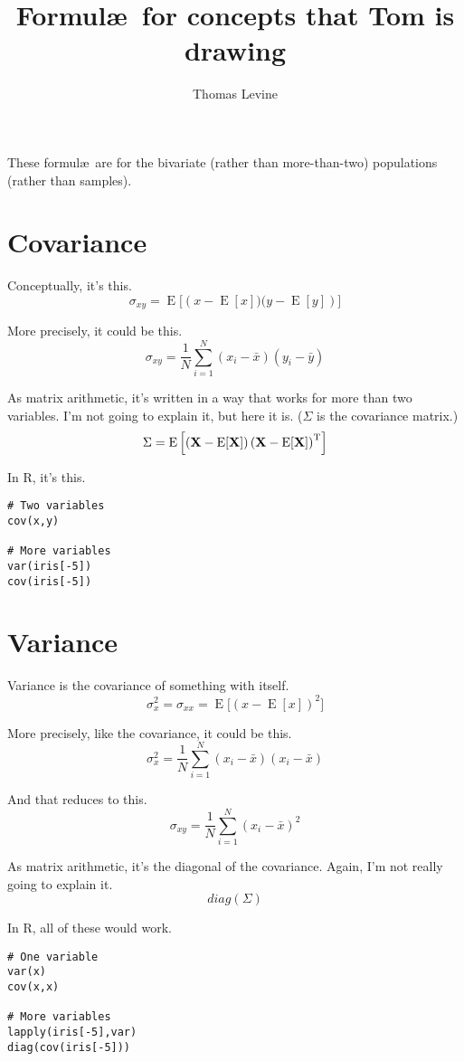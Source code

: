 \documentclass{article}
\title{Formul\ae\ for concepts that Tom is drawing}
\author{Thomas Levine}
\begin{document}
\maketitle

These formul\ae\ are for the bivariate (rather than more-than-two) populations (rather than samples).

\section{Covariance}
Conceptually, it's this.
$$ \sigma_{xy} = \operatorname{E}{\big[\left(x - \operatorname{E}[x])(y - \operatorname{E}[y]\right)\big]} $$

More precisely, it could be this.
$$ \sigma_{xy} = \frac{1}{N}\sum_{i=1}^{N}\left( x_{i}-\bar{x} \right) \left( y_{i}-\bar{y} \right) $$

As matrix arithmetic, it's written in a way that works for more than two variables.
I'm not going to explain it, but here it is. ($\Sigma$ is the covariance matrix.)
$$ \Sigma=\mathrm{E}
\left[
 \left(
  \textbf{X} - \mathrm{E}[\textbf{X}]
   \right)
  \left(
   \textbf{X} - \mathrm{E}[\textbf{X}]
    \right)^{\rm T}
    \right]
$$

In R, it's this.

\begin{verbatim}
# Two variables
cov(x,y)

# More variables
var(iris[-5])
cov(iris[-5])
\end{verbatim}

\section{Variance}
Variance is the covariance of something with itself.
$$ \sigma_{x}^2 = \sigma_{xx} = \operatorname{E}{\big[\left(x - \operatorname{E}[x]\right)^2\big]} $$

More precisely, like the covariance, it could be this.
$$ \sigma_{x}^2 = \frac{1}{N}\sum_{i=1}^{N}\left( x_{i}-\bar{x} \right) \left( x_{i}-\bar{x} \right) $$

And that reduces to this.
$$ \sigma_{xy} = \frac{1}{N}\sum_{i=1}^{N}\left( x_{i}-\bar{x} \right)^2 $$

As matrix arithmetic, it's the diagonal of the covariance. Again, I'm not really going to explain it.
$$ diag\left(\Sigma\right) $$

In R, all of these would work.
\begin{verbatim}
# One variable
var(x)
cov(x,x)

# More variables
lapply(iris[-5],var)
diag(cov(iris[-5]))
\end{verbatim}
\end{document}
